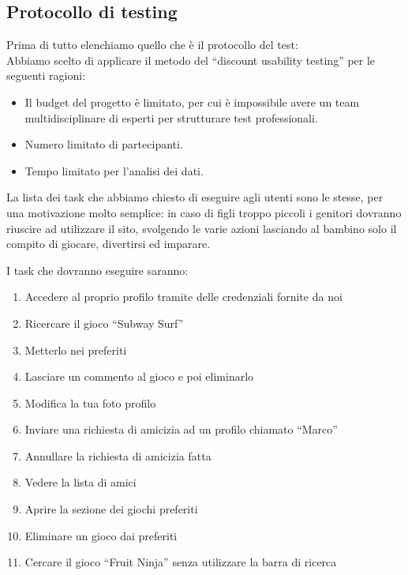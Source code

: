 \documentclass[../Report.tex]{subfiles}
\begin{document}
    \subsection{Protocollo di testing }
    Prima di tutto elenchiamo quello che è il protocollo del test:\\
    Abbiamo scelto di applicare il metodo del “discount usability testing” per le seguenti ragioni:
    \begin{itemize}
        \item Il budget del progetto è limitato, per cui è impossibile avere un team multidisciplinare di esperti per strutturare test professionali. 
        \item Numero limitato di partecipanti. 
        \item Tempo limitato per l’analisi dei dati.
    \end{itemize}

    La lista dei task che abbiamo chiesto di eseguire agli utenti sono le stesse, per una motivazione molto semplice: in caso di figli troppo piccoli i genitori dovranno riuscire ad utilizzare il sito, svolgendo le varie azioni lasciando al bambino solo il compito di giocare, divertirsi ed imparare. 

    I task che dovranno eseguire saranno:
    \begin{enumerate}
        \item Accedere al proprio profilo tramite delle credenziali fornite da noi
        \item  Ricercare il gioco “Subway Surf”
        \item Metterlo nei preferiti 
        \item Lasciare un commento al gioco e poi eliminarlo 
        \item Modifica la tua foto profilo
        \item Inviare una richiesta di amicizia ad un profilo chiamato “Marco”
        \item Annullare la richiesta di amicizia fatta
        \item Vedere la lista di amici
        \item Aprire la sezione dei giochi preferiti 
        \item Eliminare un gioco dai preferiti 
        \item Cercare il gioco “Fruit Ninja” senza utilizzare la barra di ricerca
        
    \end{enumerate}
\end{document}
